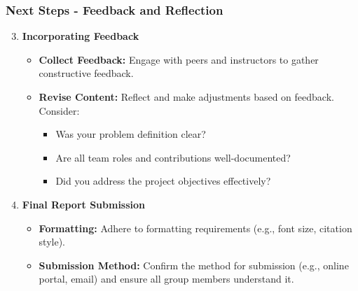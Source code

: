 \documentclass[aspectratio=169]{beamer}
\begin{document}
\begin{frame}[fragile]
  \frametitle{Next Steps - Feedback and Reflection}
  \begin{enumerate}
    \setcounter{enumi}{2} %
    \item \textbf{Incorporating Feedback}
    \begin{itemize}
      \item \textbf{Collect Feedback:} Engage with peers and instructors to gather constructive feedback.
      \item \textbf{Revise Content:} Reflect and make adjustments based on feedback. Consider:
      \begin{itemize}
        \item Was your problem definition clear?
        \item Are all team roles and contributions well-documented?
        \item Did you address the project objectives effectively?
      \end{itemize}
    \end{itemize}

    \item \textbf{Final Report Submission}
    \begin{itemize}
      \item \textbf{Formatting:} Adhere to formatting requirements (e.g., font size, citation style).
      \item \textbf{Submission Method:} Confirm the method for submission (e.g., online portal, email) and ensure all group members understand it.
    \end{itemize}
  \end{enumerate}
\end{frame}
\end{document}
